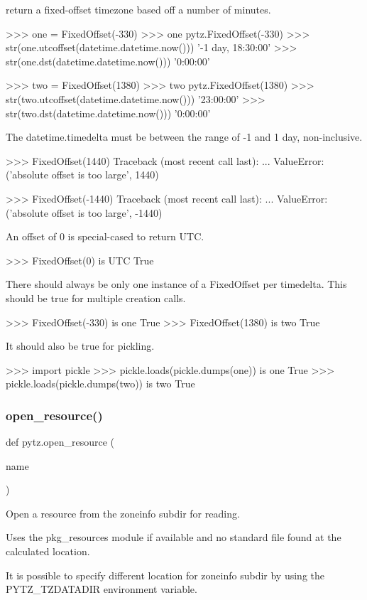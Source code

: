 \begin{DoxyVerb}return a fixed-offset timezone based off a number of minutes.

    >>> one = FixedOffset(-330)
    >>> one
    pytz.FixedOffset(-330)
    >>> str(one.utcoffset(datetime.datetime.now()))
    '-1 day, 18:30:00'
    >>> str(one.dst(datetime.datetime.now()))
    '0:00:00'

    >>> two = FixedOffset(1380)
    >>> two
    pytz.FixedOffset(1380)
    >>> str(two.utcoffset(datetime.datetime.now()))
    '23:00:00'
    >>> str(two.dst(datetime.datetime.now()))
    '0:00:00'

The datetime.timedelta must be between the range of -1 and 1 day,
non-inclusive.

    >>> FixedOffset(1440)
    Traceback (most recent call last):
    ...
    ValueError: ('absolute offset is too large', 1440)

    >>> FixedOffset(-1440)
    Traceback (most recent call last):
    ...
    ValueError: ('absolute offset is too large', -1440)

An offset of 0 is special-cased to return UTC.

    >>> FixedOffset(0) is UTC
    True

There should always be only one instance of a FixedOffset per timedelta.
This should be true for multiple creation calls.

    >>> FixedOffset(-330) is one
    True
    >>> FixedOffset(1380) is two
    True

It should also be true for pickling.

    >>> import pickle
    >>> pickle.loads(pickle.dumps(one)) is one
    True
    >>> pickle.loads(pickle.dumps(two)) is two
    True
\end{DoxyVerb}
 \mbox{\label{namespacepytz_a902975213c079691292a54e1a341891c}} 
\subsubsection{\texorpdfstring{open\+\_\+resource()}{open\_resource()}}
{\footnotesize\ttfamily def pytz.\+open\+\_\+resource (\begin{DoxyParamCaption}\item[{}]{name }\end{DoxyParamCaption})}

\begin{DoxyVerb}Open a resource from the zoneinfo subdir for reading.

Uses the pkg_resources module if available and no standard file
found at the calculated location.

It is possible to specify different location for zoneinfo
subdir by using the PYTZ_TZDATADIR environment variable.
\end{DoxyVerb}
 \mbox{\label{namespacepytz_a438c8878c1f251185ee9f2233acf6f89}} 
